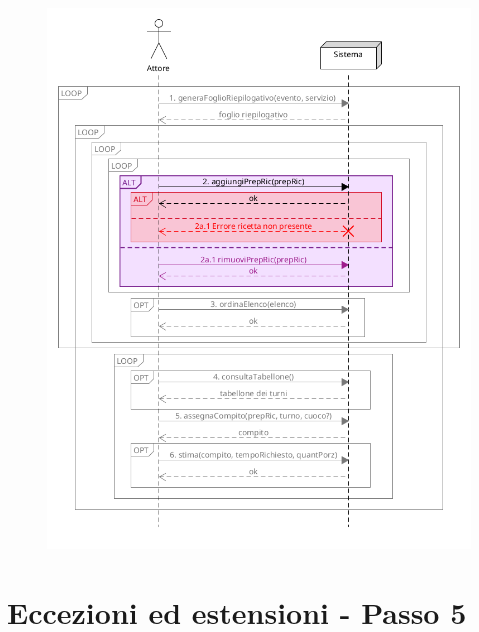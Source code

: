 \begin{figure}[h]
  \begin{center}
    \includegraphics[scale = 0.53]{images/SSD/SSD - passo 2.png}
  \end{center}
\end{figure}

\pagebreak

\section{Eccezioni ed estensioni - Passo 5}

\pagebreak
